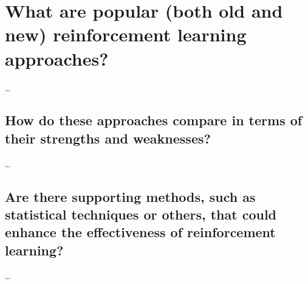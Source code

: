 \section{What are popular (both old and new) reinforcement learning approaches?  }
\dots

\subsection{How do these approaches compare in terms of their strengths and weaknesses?  }
\dots

\subsection{Are there supporting methods, such as statistical techniques or others, that could enhance the effectiveness of reinforcement learning?}
\dots
